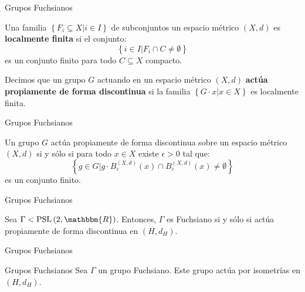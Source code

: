 \documentclass[xcolor=dvipsnames]{beamer}
\theoremstyle{largebreak}
\newcommand{\bbm}[1]{\ensuremath{\mathbbm{#1}}}
\newcommand{\PSL}[1]{\ensuremath{\textup{PSL}\left(#1\right)}}
\begin{document}
\begin{frame}{Grupos Fuchsianos}
    \begin{mydef}
        Una familia $\left\{F_i\subseteq X\Big|i\in I \right\}$ de subconjuntos un espacio métrico $(X,d)$ es \textbf{localmente finita} si el conjunto:
        \begin{equation*}
            \left\{i\in I \Big|F_i\cap C\neq\emptyset \right\}
        \end{equation*}
        es un conjunto finito para todo $C\subseteq X$ compacto.
    \end{mydef}

    \begin{mydef}
        Decimos que un grupo $G$ actuando en un espacio métrico $(X,d)$ \textbf{actúa propiamente de forma discontinua} si la familia $\left\{G\cdot x\Big|x\in X \right\}$ es localmente finita.
    \end{mydef}
\end{frame}

\begin{frame}{Grupos Fuchsianos}
    \begin{theor}
        Un grupo $G$ actúa propiamente de forma discontinua sobre un espacio métrico $(X,d)$ si y sólo si para todo $x\in X$ existe $\epsilon>0$ tal que:
        \begin{equation*}
            \left\{g\in G\Big|g\cdot B_\varepsilon^{(X,d)}(x)\cap B_\varepsilon^{(X,d)}(x)\neq\emptyset \right\}
        \end{equation*}
        es un conjunto finito.
    \end{theor}
\end{frame}

\begin{frame}{Grupos Fuchsianos}
    \begin{theor}
        Sea $\Gamma<\PSL{2,\bbm{R}}$. Entonces, $\Gamma$ es Fuchsiano si y sólo si actúa propiamente de forma discontinua en $(H,d_H)$.
    \end{theor}
\end{frame}

\begin{frame}{Grupos Fuchsianos}
    
\end{frame}

\begin{frame}{Grupos Fuchsianos}
    Sea $\Gamma$ un grupo Fuchsiano. Este grupo actúa por isometrías en $(H,d_H)$. 
\end{frame}
\end{document}
